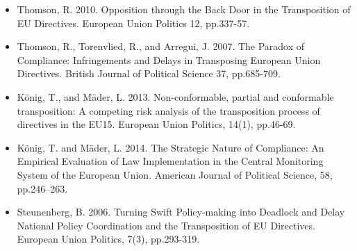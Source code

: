 \begin{itemize}
	\item Thomson, R. 2010. Opposition through the Back Door in the Transposition of EU Directives. European Union Politics 12, pp.337-57.
	\item Thomson, R., Torenvlied, R., and Arregui, J. 2007. The Paradox of Compliance: Infringements and Delays in Transposing European Union Directives. British Journal of Political Science 37, pp.685-709.
	\item K{\"o}nig, T., and M{\"a}der, L. 2013. Non-conformable, partial and conformable transposition: A competing risk analysis of the transposition process of directives in the EU15. European Union Politics, 14(1), pp.46-69.
	\item K{\"o}nig, T. and M{\"a}der, L. 2014. The Strategic Nature of Compliance: An Empirical Evaluation of Law Implementation in the Central Monitoring System of the European Union. American Journal of Political Science, 58, pp.246–263. 
	\item Steunenberg, B. 2006. Turning Swift Policy-making into Deadlock and Delay National Policy Coordination and the Transposition of EU Directives. European Union Politics, 7(3), pp.293-319.
\end{itemize}
